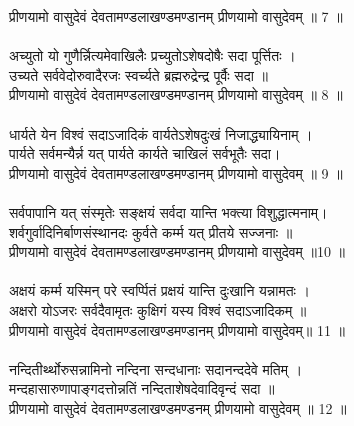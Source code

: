 प्रीणयामो वासुदेवं देवतामण्डलाखण्डमण्डानम्  प्रीणयामो वासुदेवम् ॥ 7 ॥\\
\\
अच्युतो यो गुणैर्न्नित्यमेवाखिलैः प्रच्युतोऽशेषदोषैः सदा पूर्त्तितः ।\\
उच्यते सर्ववेदोरुवादैरजः स्वर्च्यते ब्रह्मरुद्रेन्द्र पूर्वैः सदा ॥\\
प्रीणयामो वासुदेवं देवतामण्डलाखण्डमण्डानम्  प्रीणयामो वासुदेवम् ॥ 8 ॥\\
\\
धार्यते येन विश्वं सदाऽजादिकं वार्यतेऽशेषदुःखं निजाद्ध्यायिनाम् ।\\
पार्यते सर्वमन्यैर्न्न यत् पार्यते कार्यते चाखिलं सर्वभूतैः सदा।\\
प्रीणयामो वासुदेवं देवतामण्डलाखण्डमण्डानम्  प्रीणयामो वासुदेवम् ॥ 9 ॥\\
\\
सर्वपापानि यत् संस्मृतेः सङ्क्षयं सर्वदा यान्ति भक्त्या विशुद्धात्मनाम्।\\
शर्वगुर्वादिनिर्बाणसंस्थानदः कुर्वते कर्म्म यत् प्रीतये सज्जनाः ॥\\
प्रीणयामो वासुदेवं देवतामण्डलाखण्डमण्डानम्  प्रीणयामो वासुदेवम् ॥10 ॥\\ 
\\
अक्षयं कर्म्म यस्मिन् परे स्वर्प्पितं प्रक्षयं यान्ति दुःखानि यन्नामतः ।\\
अक्षरो योऽजरः  सर्वदैवामृतः कुक्षिगं यस्य विश्वं सदाऽजादिकम् ॥\\
प्रीणयामो वासुदेवं देवतामण्डलाखण्डमण्डानम्  प्रीणयामो वासुदेवम्॥ 11 ॥\\
\\
नन्दितीर्थ्थोरुसन्नामिनो नन्दिना सन्दधानाः सदानन्ददेवे मतिम् ।\\
मन्दहासारुणापाङ्गदत्तोन्नतिं नन्दिताशेषदेवादिवृन्दं सदा ॥\\
प्रीणयामो वासुदेवं देवतामण्डलाखण्डमण्डनम्  प्रीणयामो वासुदेवम् ॥ 12 ॥\\
\\
